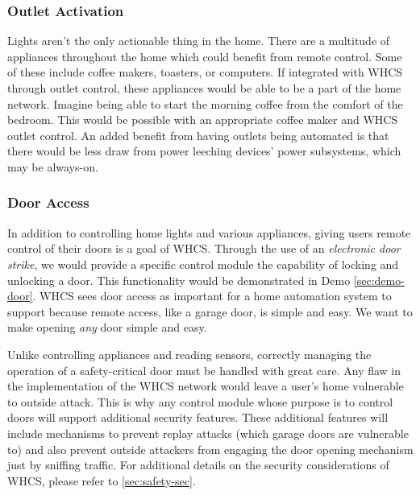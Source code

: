 \subsubsection{Outlet Activation}
Lights aren't the only actionable thing in the home. There are a multitude of
appliances throughout the home which could benefit from remote control. Some
of these include coffee makers, toasters, or computers. If integrated with WHCS through outlet control, these appliances
would be able to be a part of the home network. Imagine being able to start the
morning coffee from the comfort of the bedroom. This would be possible with an
appropriate coffee maker and WHCS outlet control. An added benefit from having
outlets being automated is that there would be less draw from power leeching
devices' power subsystems, which may be always-on. 

\subsubsection{Door Access}
In addition to controlling home lights and various appliances, giving users
remote control of their doors is  a goal of WHCS. Through the use of an
\emph{electronic door strike}, we would provide a specific control module the
capability of locking and unlocking a door. This functionality would be
demonstrated in Demo \ref{sec:demo-door}. WHCS sees door access as important
for a home automation system to support because remote access, like a garage
door, is simple and easy. We want to make opening \emph{any} door simple and
easy.

Unlike controlling appliances and reading sensors, correctly managing the
operation of a safety-critical door must be handled with great care. Any flaw
in the implementation of the WHCS network would leave a user's home vulnerable
to outside attack. This is why any control module whose purpose is to control
doors will support additional security features. These additional features will
include mechanisms to prevent replay attacks (which garage doors are vulnerable
to) and also prevent outside attackers from engaging the door opening mechanism
just by sniffing traffic. For additional details on the security considerations
of WHCS, please refer to \autoref{sec:safety-sec}.

